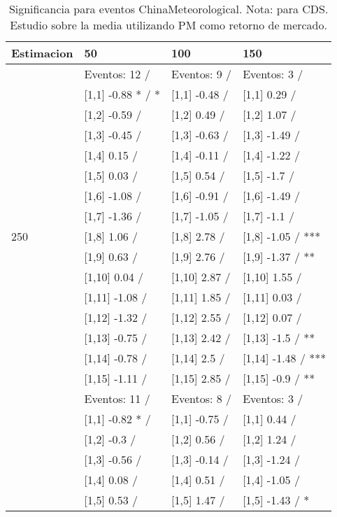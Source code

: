 \begin{table}

\caption{Significancia para eventos ChinaMeteorological. Nota: para CDS. Estudio sobre la media utilizando PM como retorno de mercado.}
\centering
\begin{tabular}[t]{llll}
\toprule
Estimacion & 50 & 100 & 150\\
\midrule
 & Eventos:  12 / & Eventos:  9 / & Eventos:  3 /\\
 & {}[1,1] -0.88 * / * & {}[1,1] -0.48  / & {}[1,1] 0.29  /\\
 & {}[1,2] -0.59  / & {}[1,2] 0.49  / & {}[1,2] 1.07  /\\
 & {}[1,3] -0.45  / & {}[1,3] -0.63  / & {}[1,3] -1.49  /\\
 & {}[1,4] 0.15  / & {}[1,4] -0.11  / & {}[1,4] -1.22  /\\
\addlinespace
 & {}[1,5] 0.03  / & {}[1,5] 0.54  / & {}[1,5] -1.7  /\\
 & {}[1,6] -1.08  / & {}[1,6] -0.91  / & {}[1,6] -1.49  /\\
 & {}[1,7] -1.36  / & {}[1,7] -1.05  / & {}[1,7] -1.1  /\\
250 & {}[1,8] 1.06  / & {}[1,8] 2.78  / & {}[1,8] -1.05  / ***\\
 & {}[1,9] 0.63  / & {}[1,9] 2.76  / & {}[1,9] -1.37  / **\\
\addlinespace
 & {}[1,10] 0.04  / & {}[1,10] 2.87  / & {}[1,10] 1.55  /\\
 & {}[1,11] -1.08  / & {}[1,11] 1.85  / & {}[1,11] 0.03  /\\
 & {}[1,12] -1.32  / & {}[1,12] 2.55  / & {}[1,12] 0.07  /\\
 & {}[1,13] -0.75  / & {}[1,13] 2.42  / & {}[1,13] -1.5  / **\\
 & {}[1,14] -0.78  / & {}[1,14] 2.5  / & {}[1,14] -1.48  / ***\\
\addlinespace
 & {}[1,15] -1.11  / & {}[1,15] 2.85  / & {}[1,15] -0.9  / **\\
 & Eventos:  11 / & Eventos:  8 / & Eventos:  3 /\\
 & {}[1,1] -0.82 * / & {}[1,1] -0.75  / & {}[1,1] 0.44  /\\
 & {}[1,2] -0.3  / & {}[1,2] 0.56  / & {}[1,2] 1.24  /\\
 & {}[1,3] -0.56  / & {}[1,3] -0.14  / & {}[1,3] -1.24  /\\
\addlinespace
 & {}[1,4] 0.08  / & {}[1,4] 0.51  / & {}[1,4] -1.05  /\\
 & {}[1,5] 0.53  / & {}[1,5] 1.47  / & {}[1,5] -1.43  / *\\

\end{tabular}
\end{table}
